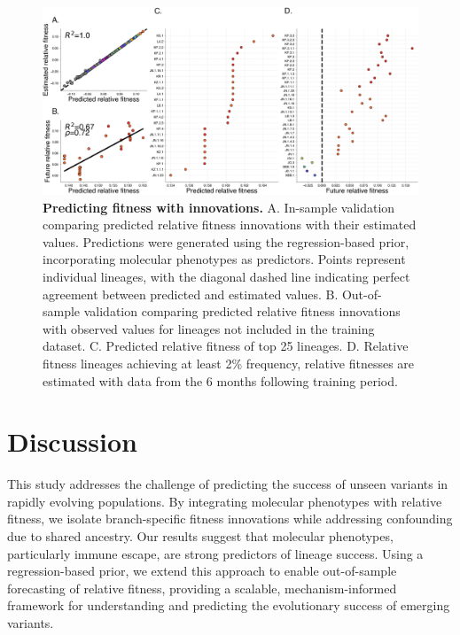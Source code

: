 \begin{figure}[h]
	\centering
	\includegraphics[width=1.0\textwidth]{./figures/predicting-fitness-with-innovations.png}
	\caption[\textbf{Predicting fitness with innovations.}]{
	    \textbf{Predicting fitness with innovations.}
	    A. In-sample validation comparing predicted relative fitness innovations with their estimated values.
	    Predictions were generated using the regression-based prior, incorporating molecular phenotypes as predictors.
	    Points represent individual lineages, with the diagonal dashed line indicating perfect agreement between predicted and estimated values.
	    B. Out-of-sample validation comparing predicted relative fitness innovations with observed values for lineages not included in the training dataset.
	    C. Predicted relative fitness of top 25 lineages.
	    D. Relative fitness lineages achieving at least 2\% frequency, relative fitnesses are estimated with data from the 6 months following training period.
	}
	\label{fig:predicting-fitness-with-innovations}
\end{figure}

\section{Discussion}

This study addresses the challenge of predicting the success of unseen variants in rapidly evolving populations.
By integrating molecular phenotypes with relative fitness, we isolate branch-specific fitness innovations while addressing confounding due to shared ancestry.
Our results suggest that molecular phenotypes, particularly immune escape, are strong predictors of lineage success.
Using a regression-based prior, we extend this approach to enable out-of-sample forecasting of relative fitness, providing a scalable, mechanism-informed framework for understanding and predicting the evolutionary success of emerging variants.

